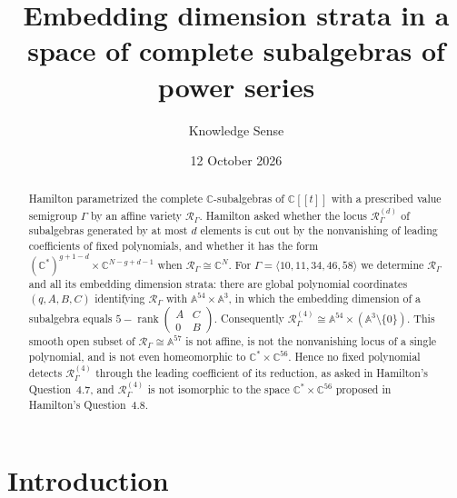 \documentclass{amsart}
\theoremstyle{definition}
\theoremstyle{remark}
\numberwithin{equation}{section}
\newcommand{\CC}{\mathbb{C}}
\newcommand{\AF}{\mathbb{A}}
\newcommand{\Rs}{\mathcal{R}_\Gamma}
\newcommand{\Rd}[1]{\mathcal{R}^{(#1)}_\Gamma}
\newcommand{\ps}{[\![t]\!]}
\DeclareMathOperator{\rank}{rank}
\begin{document}
\title[Embedding dimension strata]{Embedding dimension strata in a space of complete subalgebras of power series}

\author{Knowledge Sense}
\address{Knowledge Sense}

\date{12 October 2026}


\begin{abstract}
Hamilton parametrized the complete $\CC$-subalgebras of $\CC\ps$ with a prescribed value semigroup $\Gamma$ by an affine variety $\Rs$. Hamilton asked whether the locus $\Rd{d}$ of subalgebras generated by at most $d$ elements is cut out by the nonvanishing of leading coefficients of fixed polynomials, and whether it has the form $(\CC^*)^{g+1-d}\times\CC^{N-g+d-1}$ when $\Rs\cong\CC^N$. For $\Gamma=\langle 10,11,34,46,58\rangle$ we determine $\Rs$ and all its embedding dimension strata: there are global polynomial coordinates $(q,A,B,C)$ identifying $\Rs$ with $\AF^{54}\times\AF^3$, in which the embedding dimension of a subalgebra equals $5-\rank\left(\begin{smallmatrix}A&C\\0&B\end{smallmatrix}\right)$. Consequently $\Rd{4}\cong\AF^{54}\times(\AF^3\setminus\{0\})$. This smooth open subset of $\Rs\cong\AF^{57}$ is not affine, is not the nonvanishing locus of a single polynomial, and is not even homeomorphic to $\CC^*\times\CC^{56}$. Hence no fixed polynomial detects $\Rd{4}$ through the leading coefficient of its reduction, as asked in Hamilton's Question~4.7, and $\Rd{4}$ is not isomorphic to the space $\CC^*\times\CC^{56}$ proposed in Hamilton's Question~4.8.
\end{abstract}

\maketitle

\section{Introduction}\label{sec:intro}
\end{document}

